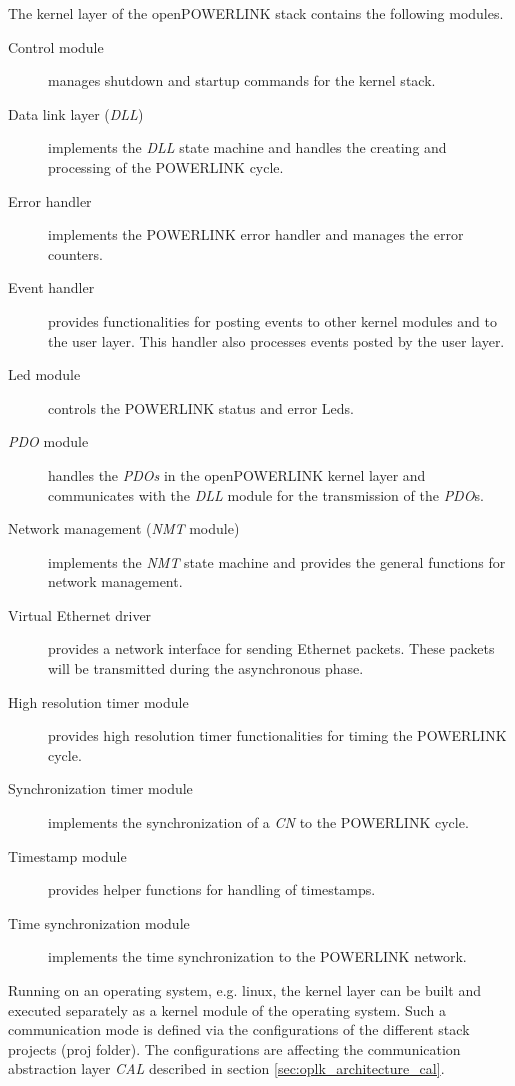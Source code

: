 The kernel layer of the openPOWERLINK stack contains the following modules. \cite[openPOWERLINK Kernel Layer]{openpowerlink_doc}

\begin{description}
    \item[Control module] manages shutdown and startup commands for the kernel stack.
    \item[Data link layer (\emph{DLL})] implements the \emph{DLL} state machine and handles the creating and processing of the POWERLINK cycle.
    \item[Error handler] implements the POWERLINK error handler and manages the error counters.
    \item[Event handler] provides functionalities for posting events to other kernel modules and to the user layer.
    This handler also processes events posted by the user layer.
    \item[Led module] controls the POWERLINK status and error Leds.
    \item[\emph{PDO} module] handles the \emph{PDOs} in the openPOWERLINK kernel layer and communicates with the \emph{DLL} module for the transmission of the \emph{PDO}s.
    \item[Network management (\emph{NMT} module)] implements the \emph{NMT} state machine and provides the general functions for network management.
    \item[Virtual Ethernet driver] provides a network interface for sending Ethernet packets.
    These packets will be transmitted during the asynchronous phase.
    \item[High resolution timer module] provides high resolution timer functionalities for timing the POWERLINK cycle.
    \item[Synchronization timer module] implements the synchronization of a \emph{CN} to the POWERLINK cycle.
    \item[Timestamp module] provides helper functions for handling of timestamps.
    \item[Time synchronization module] implements the time synchronization to the POWERLINK network.
\end{description}

Running on an operating system, e.g. linux, the kernel layer can be built and executed separately as a kernel module of the operating system.
Such a communication mode is defined via the configurations of the different stack projects (proj folder).
The configurations are affecting the communication abstraction layer \emph{CAL} described in section \ref{sec:oplk_architecture_cal}.

